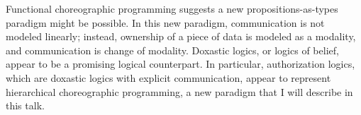 Functional choreographic programming suggests a new propositions-as-types paradigm might be possible.
In this new paradigm, communication is not modeled linearly; instead, ownership of a piece of data is modeled as a modality, and communication is change of modality.
Doxastic logics, or logics of belief, appear to be a promising logical counterpart.
In particular, authorization logics, which are doxastic logics with explicit communication, appear to represent hierarchical choreographic programming, a new paradigm that I will describe in this talk.

